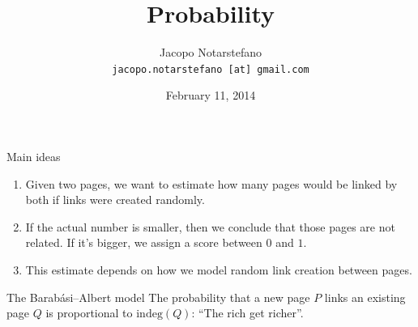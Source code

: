 \documentclass[12pt]{beamer}
\title{Probability}
\author[Jacopo Notarstefano]{
    Jacopo Notarstefano\\
    \texttt{jacopo.notarstefano [at] gmail.com}
}
\date{February 11, 2014}
\begin{document}
    \begin{frame}[plain]
        \titlepage
    \end{frame}

    \begin{frame}{Main ideas}
        \begin{enumerate}
            \item Given two pages, we want to estimate how many pages would be linked
            by both if links were created randomly.
            \item If the actual number is smaller, then we conclude that those pages
            are not related. If it's bigger, we assign a score between \(0\) and \(1\).
            \item This estimate depends on how we model random link creation between
            pages.
        \end{enumerate}
    \end{frame}

    \begin{frame}{The Barabási–Albert model}
        The probability that a new page \(P\) links an existing page \(Q\) is
        proportional to \(\text{indeg}(Q)\): ``The rich get richer''.
        \begin{figure}
        \end{figure}
    \end{frame}
\end{document}
